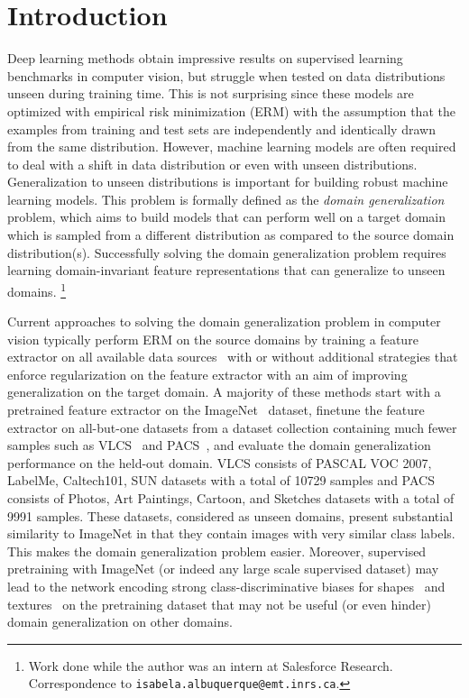 \documentclass[runningheads]{llncs}
\newcommand\blfootnote[1]{\begingroup
  \renewcommand\thefootnote{}\footnote{#1}\addtocounter{footnote}{-1}\endgroup
}
\begin{document}
\section{Introduction}
Deep learning methods obtain impressive results on supervised learning benchmarks in computer vision, but struggle when tested on data distributions unseen during training time. This is not surprising since these models are optimized with empirical risk minimization (ERM) with the assumption that the examples from training and test sets are independently and identically drawn from the same distribution. However, machine learning models are often required to deal with a shift in data distribution or even with unseen distributions. Generalization to unseen distributions is important for building robust machine learning models. This problem is formally defined as the \textit{domain generalization} problem, which aims to build models that can perform well on a target domain which is sampled from a different distribution as compared to the source domain distribution(s). Successfully solving the domain generalization problem requires learning domain-invariant feature representations that can generalize to unseen domains. \blfootnote{ Work done while the author was an intern at Salesforce Research. Correspondence to \texttt{isabela.albuquerque@emt.inrs.ca}.} 

Current approaches to solving the domain generalization problem in computer vision typically perform ERM on the source domains by training a feature extractor on all available data sources~\cite{li2017deeper,li2018learning,carlucci2019domain} with or without additional strategies that enforce regularization on the feature extractor with an aim of improving generalization on the target domain. A  majority of these methods start with a pretrained feature extractor on the ImageNet~\cite{deng2009imagenet} dataset, finetune the feature extractor on all-but-one datasets from a dataset collection containing much fewer samples such as VLCS~\cite{torralba2011unbiased} and PACS~\cite{li2017deeper}, and evaluate the domain generalization performance on the held-out domain.  VLCS consists of PASCAL VOC 2007, LabelMe, Caltech101, SUN datasets with a total of 10729 samples and  PACS consists of Photos, Art Paintings, Cartoon, and Sketches datasets with a total of 9991 samples. These datasets, considered as unseen domains, present substantial similarity to ImageNet in that they contain images with very similar class labels. This makes the domain generalization problem easier. Moreover, supervised pretraining with ImageNet (or indeed any large scale supervised dataset) may lead to the network encoding strong class-discriminative biases for shapes~\cite{kriegeskorte2015deep} and textures~\cite{geirhos2018imagenet} on the pretraining dataset that may not be useful (or even hinder) domain generalization on other domains. 
\end{document}
